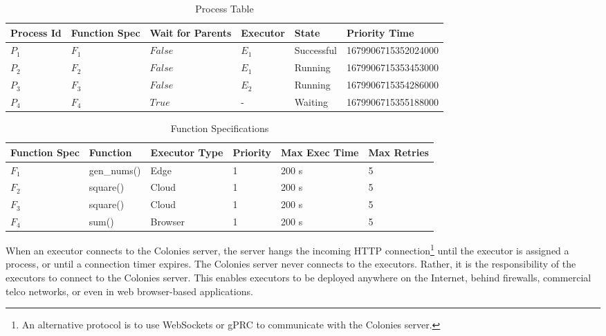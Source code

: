 \documentclass{article}
\begin{document}
\begin{table}[t]
	\caption{Process Table}
	\centering
	\begin{tabular}{llllll}
		\toprule
		\cmidrule(r){1-2}
        Process Id & Function Spec & Wait for Parents & Executor  & State      & Priority Time \\
		\midrule
        $P_{1}$    & $F_{1}$       & $False$          & $E_{1}$   & Successful & 1679906715352024000 \\
        $P_{2}$    & $F_{2}$       & $False$          & $E_{1}$   & Running    & 1679906715353453000 \\
        $P_{3}$    & $F_{3}$       & $False$          & $E_{2}$   & Running    & 1679906715354286000 \\
        $P_{4}$    & $F_{4}$       & $True$           & -         & Waiting    & 1679906715355188000 \\
		\bottomrule
	\end{tabular}
	\label{proctable}
\end{table}

\begin{table}[t]
	\caption{Function Specifications}
	\centering
	\begin{tabular}{llllll}
		\toprule
		\cmidrule(r){1-2}
        Function Spec & Function        & Executor Type & Priority & Max Exec Time & Max Retries \\
		\midrule
        $F_{1}$       & gen\_nums()     & Edge          & 1        & 200 s         & 5 \\
        $F_{2}$       & square()        & Cloud         & 1        & 200 s         & 5 \\
        $F_{3}$       & square()        & Cloud         & 1        & 200 s         & 5 \\
        $F_{4}$       & sum()           & Browser       & 1        & 200 s         & 5 \\
		\bottomrule
	\end{tabular}
	\label{functable}
\end{table}

When an executor connects to the Colonies server, the server hangs the incoming HTTP connection\footnote{An alternative protocol is to use WebSockets or gPRC to communicate with the Colonies server.} until the executor is assigned a process, or until a connection timer expires. The Colonies server never connects to the executors. Rather, it is the responsibility of the executors to connect to the Colonies server. This enables executors to be deployed anywhere on the Internet, behind firewalls, commercial telco networks, or even in web browser-based applications.
\end{document}
